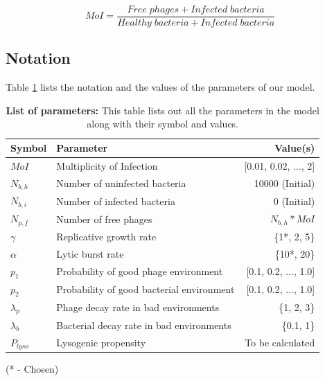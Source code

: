 \documentclass[12pt,letterpaper]{article}
\begin{document}
\begin{equation}
\label{eq2}
MoI = \frac{Free\;phages + Infected\;bacteria}{Healthy\;bacteria + Infected\;bacteria}
\end{equation}

\subsection*{Notation}
Table \ref{tab1} lists the notation and the values of the parameters of our model.

\begin{table}[!ht]
\setlength\extrarowheight{5pt}
\centering
\caption{{\bf List of parameters:} This table lists out all the parameters in the model along with their symbol and values.}
\begin{tabular}{|l|l|r|}
\hline
\multicolumn{1}{|l|}{\bf Symbol} & \multicolumn{1}{|l|}{\bf Parameter} & \multicolumn{1}{|r|}{\bf Value(s)}\\[5pt] \hline
$MoI$ & Multiplicity of Infection & [0.01, 0.02, ..., 2] \\[5pt] \hline
$N_{b,h}$ & Number of uninfected bacteria & 10000 (Initial) \\[5pt] \hline
$N_{b,i}$ & Number of infected bacteria & 0 (Initial) \\[5pt] \hline
$N_{p,f}$ & Number of free phages & $N_{b,h}*MoI$ \\[5pt] \hline
$\gamma$ & Replicative growth rate & \{1*, 2, 5\} \\[5pt] \hline
$\alpha$ & Lytic burst rate & \{10*, 20\} \\[5pt] \hline
$p_1$ & Probability of good phage environment & [0.1, 0.2, ..., 1.0] \\[5pt] \hline
$p_2$ & Probability of good bacterial environment & [0.1, 0.2, ..., 1.0] \\[5pt] \hline
$\lambda_{p}$ & Phage decay rate in bad environments & \{1, 2, 3\} \\[5pt] \hline
$\lambda_{b}$ & Bacterial decay rate in bad environments & \{0.1, 1\} \\[5pt] \hline
$P_{lyso}$ & Lysogenic propensity & To be calculated \\[5pt] \hline
\end{tabular}
\label{tab1}
\end{table}
(* - Chosen)
\end{document}
